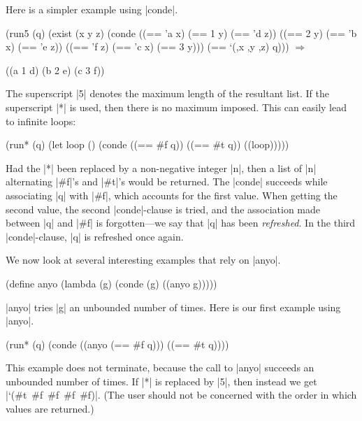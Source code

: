 Here is a simpler example using \scheme|conde|.

\schemedisplayspace
\begin{schemedisplay}
(run5 (q)
  (exist (x y z)
    (conde
      ((== 'a x) (== 1 y) (== 'd z))
      ((== 2 y) (== 'b x) (== 'e z))
      ((== 'f z) (== 'c x) (== 3 y)))
    (== `(,x ,y ,z) q))) $\Rightarrow$
\end{schemedisplay}
\nspace
\begin{schemeresponse}
((a 1 d) (b 2 e) (c 3 f))
\end{schemeresponse}

\noindent The superscript \scheme|5| denotes the maximum length of the resultant
list.  If the superscript \scheme|*| is used, then there is no maximum
imposed.  This can easily lead to infinite loops:

\schemedisplayspace
\begin{schemedisplay}
(run* (q)
  (let loop ()
    (conde
      ((== #f q))
      ((== #t q))
      ((loop)))))
\end{schemedisplay}

\noindent Had the \scheme|*| been replaced by a non-negative integer \scheme|n|, then
a list of \scheme|n| alternating \scheme|#f|'s and \scheme|#t|'s would be returned.  
The \scheme|conde| succeeds while associating \scheme|q| with \scheme|#f|, which 
accounts for the first value.  When getting the second value, 
the second \scheme|conde|-clause is tried, and the association made between \scheme|q| and \scheme|#f| is forgotten---we
say that \scheme|q| has been \emph{refreshed}.  In the third 
\scheme|conde|-clause, 
\scheme|q| is refreshed once again.

We now look at several interesting examples that rely on \scheme|anyo|.

\schemedisplayspace
\begin{schemedisplay}
(define anyo 
  (lambda (g)
    (conde
      (g)
      ((anyo g)))))
\end{schemedisplay}

\noindent \scheme|anyo| tries \scheme|g| an unbounded number of times.
Here is our first example using \scheme|anyo|.

\schemedisplayspace
\begin{schemedisplay}
(run* (q)
  (conde
    ((anyo (== #f q)))
    ((== #t q))))
\end{schemedisplay}

\noindent This example does not terminate, because the call to
\scheme|anyo| succeeds an unbounded number of times.
If \scheme|*| is replaced by \scheme|5|, then instead we get
 \mbox{\schemeresult|`(#t #f #f #f #f)|}.
(The user should not be concerned with the order in which values are returned.)

